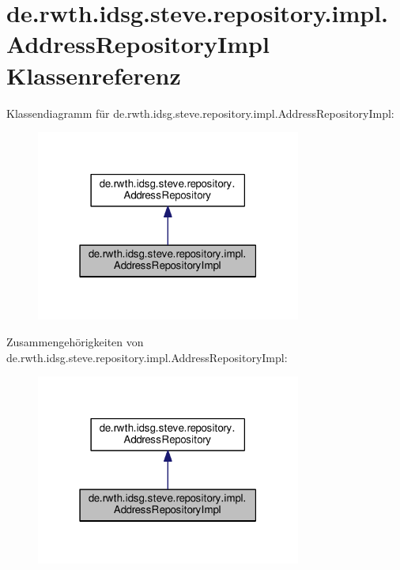 \hypertarget{classde_1_1rwth_1_1idsg_1_1steve_1_1repository_1_1impl_1_1_address_repository_impl}{\section{de.\+rwth.\+idsg.\+steve.\+repository.\+impl.\+Address\+Repository\+Impl Klassenreferenz}
\label{classde_1_1rwth_1_1idsg_1_1steve_1_1repository_1_1impl_1_1_address_repository_impl}
}


Klassendiagramm für de.\+rwth.\+idsg.\+steve.\+repository.\+impl.\+Address\+Repository\+Impl\+:\nopagebreak
\begin{figure}[H]
\begin{center}
\leavevmode
\includegraphics[width=247pt]{classde_1_1rwth_1_1idsg_1_1steve_1_1repository_1_1impl_1_1_address_repository_impl__inherit__graph}
\end{center}
\end{figure}


Zusammengehörigkeiten von de.\+rwth.\+idsg.\+steve.\+repository.\+impl.\+Address\+Repository\+Impl\+:\nopagebreak
\begin{figure}[H]
\begin{center}
\leavevmode
\includegraphics[width=247pt]{classde_1_1rwth_1_1idsg_1_1steve_1_1repository_1_1impl_1_1_address_repository_impl__coll__graph}
\end{center}
\end{figure}
